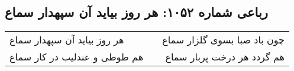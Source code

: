 \begin{center}
\section*{رباعی شماره ۱۰۵۲: هر روز بیاید آن سپهدار سماع}
\label{sec:1052}
\begin{longtable}{l p{0.5cm} r}
هر روز بیاید آن سپهدار سماع
&&
چون باد صبا بسوی گلزار سماع
\\
هم طوطی و عندلیب در کار سماع
&&
هم گردد هر درخت پربار سماع
\\
\end{longtable}
\end{center}
